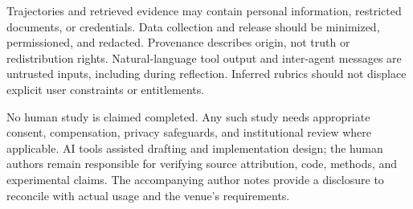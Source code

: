 \documentclass[11pt]{article}
\begin{document}
Trajectories and retrieved evidence may contain personal information, restricted documents, or credentials. Data collection and release should be minimized, permissioned, and redacted. Provenance describes origin, not truth or redistribution rights. Natural-language tool output and inter-agent messages are untrusted inputs, including during reflection. Inferred rubrics should not displace explicit user constraints or entitlements.

No human study is claimed completed. Any such study needs appropriate consent, compensation, privacy safeguards, and institutional review where applicable. AI tools assisted drafting and implementation design; the human authors remain responsible for verifying source attribution, code, methods, and experimental claims. The accompanying author notes provide a disclosure to reconcile with actual usage and the venue's requirements.

\clearpage

\clearpage
\appendix

\end{document}
